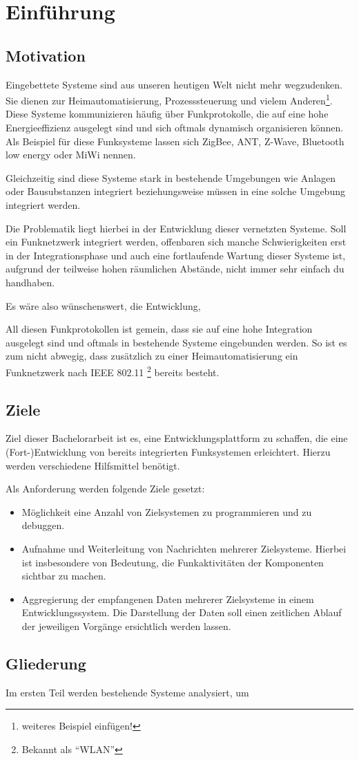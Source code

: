 \chapter{Einführung}
\adjustmtc
\minitoc
\section{Motivation}
Eingebettete Systeme sind aus unseren heutigen Welt nicht mehr wegzudenken. Sie
dienen zur Heimautomatisierung, Prozesssteuerung und vielem
Anderen\footnote{weiteres Beispiel einfügen!}. Diese Systeme kommunizieren
häufig über Funkprotokolle, die auf eine hohe Energieeffizienz ausgelegt sind
und sich oftmals dynamisch organisieren können. Als Beispiel für diese
Funksysteme lassen sich ZigBee, ANT, Z-Wave, Bluetooth low energy oder MiWi
nennen.

Gleichzeitig sind diese Systeme stark in bestehende Umgebungen wie Anlagen oder
Bausubstanzen integriert beziehungsweise müssen in eine solche Umgebung
integriert werden.

Die Problematik liegt hierbei in der Entwicklung dieser vernetzten Systeme. Soll
ein Funknetzwerk integriert werden, offenbaren sich manche Schwierigkeiten erst
in der Integrationsphase und auch eine fortlaufende Wartung dieser Systeme ist,
aufgrund der teilweise hohen räumlichen Abstände, nicht immer sehr einfach du
handhaben.

Es wäre also wünschenswert, die Entwicklung, 

All diesen Funkprotokollen ist gemein, dass sie auf eine hohe Integration
ausgelegt sind und oftmals in bestehende Systeme eingebunden werden. So ist es
zum nicht abwegig, dass zusätzlich zu einer Heimautomatisierung ein
Funknetzwerk nach IEEE 802.11 \footnote{Bekannt als "`WLAN"'} bereits
besteht.

\cite*{sample_bib}
\section{Ziele}
Ziel dieser Bachelorarbeit ist es, eine Entwicklungsplattform zu schaffen, die
eine (Fort-)Entwicklung von bereits integrierten Funksystemen erleichtert.
Hierzu werden verschiedene Hilfsmittel benötigt.

Als Anforderung werden folgende Ziele gesetzt:
\begin{itemize}
  \item Möglichkeit eine Anzahl von Zielsystemen zu programmieren und zu
  debuggen.
  \item Aufnahme und Weiterleitung von Nachrichten mehrerer Zielsysteme. Hierbei
  ist insbesondere von Bedeutung, die Funkaktivitäten der Komponenten sichtbar
  zu machen.
  \item Aggregierung der empfangenen Daten mehrerer Zielsysteme in einem
  Entwicklungssystem. Die Darstellung der Daten soll einen zeitlichen Ablauf
  der jeweiligen Vorgänge ersichtlich werden lassen.
\end{itemize}
\section{Gliederung}
Im ersten Teil werden bestehende Systeme analysiert, um 
